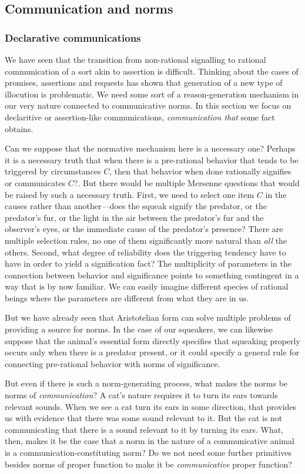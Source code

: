\subsection{Communication and norms}
\subsubsection{Declarative communications}
We have seen that the transition from non-rational signalling to rational communication of a sort akin to assertion
is difficult. Thinking
about the cases of promises, assertions and requests has shown that generation of a new type of illocution is 
problematic. We need some sort of a reason-generation mechanism in our very nature connected to communicative
norms. In this section we focus on declaritive or assertion-like communications, \textit{communication that} some fact obtains.

Can we suppose that the normative mechanism here is a necessary one? Perhaps it is a necessary truth that when
there is a pre-rational behavior that tends to be triggered by circumstances $C$, then that behavior when done rationally
signifies or communicates $C$?.
But there would be multiple Mersenne questions that would be raised by such a necessary truth. First,
we need to select one item $C$ in the causes rather than another---does the squeak signify the predator, or the predator's fur, or the
light in the air between the predator's fur and the observer's eyes, or the immediate cause of the predator's presence? 
There are multiple selection rules, 
no one of them significantly more natural than \textit{all} the others. Second, what degree of reliability does the 
triggering tendency have to have in order to yield a signification fact? 
The multiplicity of parameters in the connection between behavior and
significance points to something contingent in a way that is by now familiar. 
We can easily imagine different species of rational beings where the parameters are
different from what they are in us. 

But we have already seen that Aristotelian form can solve multiple problems of providing a source for norms.
In the case of our squeakers, we can likewise suppose that the animal's essential form directly specifies that squeaking properly occurs only when there is a 
predator present, or it could specify a general rule for connecting pre-rational behavior with norms of significance. 

But even if there is such a norm-generating process, what makes the norms be norms of \textit{communication}? A cat's nature 
requires it to turn its ears towards relevant sounds. When we see a cat turn its ears in some direction, that provides us with 
evidence that there was some sound relevant to it. But the cat is not communicating that there is a sound relevant to it by
turning its ears. What, then, makes it be the case that a norm in the nature of a communicative animal is a communication-constituting
norm? Do we not need some further primitives besides norms of proper function to make it be \textit{communicative} proper function?

